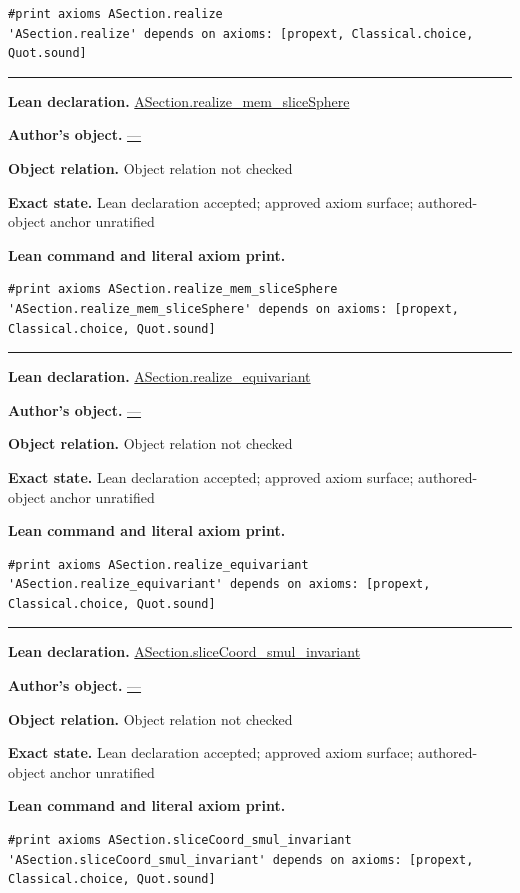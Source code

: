 \documentclass[11pt]{article}
\theoremstyle{plain}
\theoremstyle{definition}
\theoremstyle{remark}
\begin{document}
\begin{tcolorbox}[provenancecard,title={38. Definition - The section's slice data and equivariance},title after break={38. Definition - The section's slice data and equivariance (continued)}]
\begin{Verbatim}[breaklines=true,breakanywhere=true,fontsize=\small]
#print axioms ASection.realize
'ASection.realize' depends on axioms: [propext, Classical.choice, Quot.sound]
\end{Verbatim}
\medskip\hrule\medskip
\textbf{Lean declaration.} \url{ASection.realize_mem_sliceSphere}
\par\textbf{Author's object.} \url{—}
\par\textbf{Object relation.} Object relation not checked
\par\textbf{Exact state.} Lean declaration accepted; approved axiom surface; authored-object anchor unratified
\par\smallskip\textbf{Lean command and literal axiom print.}
\begin{Verbatim}[breaklines=true,breakanywhere=true,fontsize=\small]
#print axioms ASection.realize_mem_sliceSphere
'ASection.realize_mem_sliceSphere' depends on axioms: [propext, Classical.choice, Quot.sound]
\end{Verbatim}
\medskip\hrule\medskip
\textbf{Lean declaration.} \url{ASection.realize_equivariant}
\par\textbf{Author's object.} \url{—}
\par\textbf{Object relation.} Object relation not checked
\par\textbf{Exact state.} Lean declaration accepted; approved axiom surface; authored-object anchor unratified
\par\smallskip\textbf{Lean command and literal axiom print.}
\begin{Verbatim}[breaklines=true,breakanywhere=true,fontsize=\small]
#print axioms ASection.realize_equivariant
'ASection.realize_equivariant' depends on axioms: [propext, Classical.choice, Quot.sound]
\end{Verbatim}
\medskip\hrule\medskip
\textbf{Lean declaration.} \url{ASection.sliceCoord_smul_invariant}
\par\textbf{Author's object.} \url{—}
\par\textbf{Object relation.} Object relation not checked
\par\textbf{Exact state.} Lean declaration accepted; approved axiom surface; authored-object anchor unratified
\par\smallskip\textbf{Lean command and literal axiom print.}
\begin{Verbatim}[breaklines=true,breakanywhere=true,fontsize=\small]
#print axioms ASection.sliceCoord_smul_invariant
'ASection.sliceCoord_smul_invariant' depends on axioms: [propext, Classical.choice, Quot.sound]
\end{Verbatim}

\end{tcolorbox}
\end{document}
